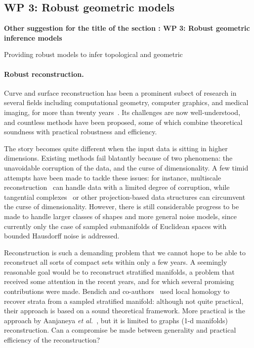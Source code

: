 \subsection*{WP 3:  Robust geometric models} 

 {\bf Other suggestion for the title of the section : WP 3:  Robust geometric inference models}


Providing robust models to infer topological and geometric 







\paragraph{Robust reconstruction.}

Curve and surface reconstruction has been a prominent subect of
research in several fields including computational geometry, computer
graphics, and medical imaging, for more than twenty
years~\cite{dey-csr-2007}. Its challenges are now well-understood, and
countless methods have been proposed, some of which combine
theoretical soundness with practical robustness and efficiency.

The story becomes quite different when the input data is sitting in
higher dimensions. Existing methods fail blatantly because of two
phenomena: the unavoidable corruption of the data, and the curse of
dimensionality. A few timid attempts have been made to tackle these
issues: for instance, multiscale
reconstruction~\cite{geometrica-bgo-09} can handle data with a limited
degree of corruption, while tangential
complexes~\cite{geometrica-7142i} or other projection-based data
structures can circumvent the curse of dimensionality. However, there
is still considerable progress to be made to handle larger classes of
shapes and more general noise models, since currently only the case of
sampled submanifolds of Euclidean spaces with bounded Hausdorff noise
is addressed.

Reconstruction is such a demanding problem that we cannot hope to be
able to reconstruct all sorts of compact sets within only a few
years. A seemingly reasonable goal would be to reconstruct stratified
manifolds, a problem that received some attention in the recent years,
and for which several promising contributions were made.  Bendich and
co-authors~\cite{bendich-PhD,bendich-strat1,bendich-strat2} used
local homology to recover strata from a sampled stratified manifold:
although not quite practical, their approach is based on a sound
theoretical framework. More practical is the approach by Aanjaneya
{\em et al.}~\cite{metric-graphs-reconstruction}, but it is limited to
graphs (1-d manifolds) reconstruction. Can a compromise be made
between generality and practical efficiency of the reconstruction?

